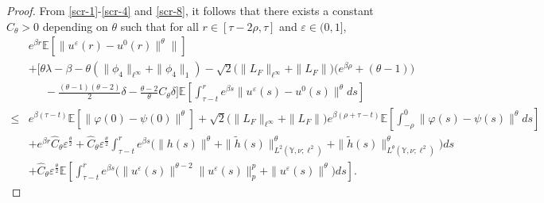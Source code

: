 \documentclass[11pt]{article}
\numberwithin{equation}{section}
\theoremstyle{plain}
\begin{document}
\begin{proof}
 From \eqref{scr-1}-\eqref{scr-4} and \eqref{scr-8}, 
 it follows that there exists a constant $\widehat{C}_\theta > 0$ depending on $\theta$ such that for all $r \in [\tau-2\rho, \tau]$ and $\varepsilon \in (0, 1]$,
 \begin{align}\label{scr-9}
       & e^{\beta r} \mathbb{E} \left[ \| u^{\varepsilon}(r) - u^0(r) \|^\theta \| \right]  \nonumber\\
       & + \bigg[ \theta \lambda 
                       - \beta 
                       - \theta \left( \|\phi_4\|_{\ell^\infty} +  \|\phi_4\|_1 \right) 
                       - \sqrt{2}
                                   \big( \|L_{F}\|_{\ell^\infty} + \|L_{F}\| \big) 
                                   \big( e^{\beta \rho} + (\theta - 1) \big)  \nonumber\\
       & \quad \ \ 
                       - \frac{(\theta - 1)(\theta - 2)}{2} \delta
                       - \frac{\theta-2}{\theta} C_{\theta} \delta
              \bigg] 
              \mathbb{E}
                     \left[ \int_{\tau-t}^{r} e^{\beta s} \|u^{\varepsilon}(s) - u^0(s)\|^\theta ds \right]  \nonumber\\
  \le & e^{\beta(\tau-t)} \mathbb{E} \left[ \| \varphi(0) - \psi(0) \|^\theta \right] 
            + \sqrt{2}
 	                \big( \|L_{F}\|_{\ell^\infty} + \|L_{F}\| \big)  e^{\beta (\rho+\tau-t) }
                        \mathbb{E}
                               \left[ \int_{-\rho}^{0}
                                             \| \varphi(s) - \psi(s) \|^\theta ds
                               \right]  \nonumber\\
        & + e^{\beta r} \widehat{C}_\theta \varepsilon^{\frac{\theta}{2} }
            + \widehat{C}_\theta \varepsilon^{\frac{\theta}{2} } 
                     \int_{\tau-t}^{r} e^{\beta s}
                          \big( \| h(s) \|^\theta
                                   + \| \widetilde{h}(s) \|_{L^2(\mathbb{Y}, \nu; \ell^2) }^\theta
                                   + \| \widetilde{h}(s) \|^{\theta}_{L^{\theta}(\mathbb{Y}, \nu; \ell^2) }
                          \big)
                      ds  \nonumber\\
       & + \widehat{C}_\theta \varepsilon^{\frac{\theta}{2} }            
                    \mathbb{E}
                          	              \left[  \int_{\tau-t}^{r} e^{\beta s}       
                                                       \big( \|u^{\varepsilon}(s)\|^{\theta-2} \|u^{\varepsilon}(s)\|_p^{p} 
                                                              	+ \|u^{\varepsilon}(s)\|^{\theta}  
                                                       \big)
                                                   ds
                                           \right].                                                                    
 \end{align}


\end{proof}
\end{document}
